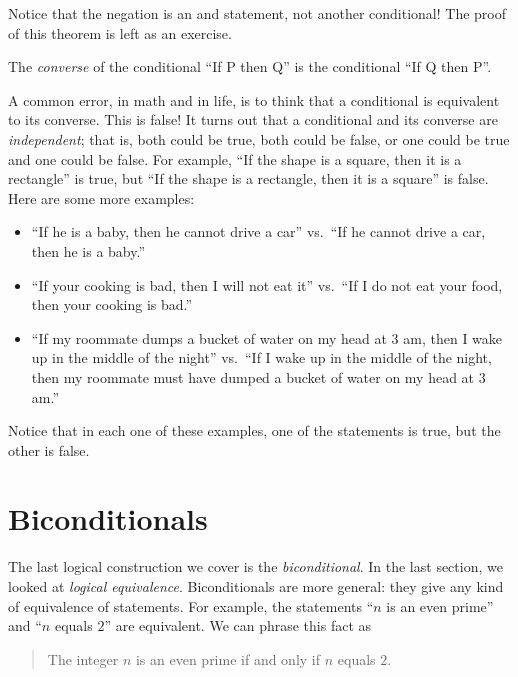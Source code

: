 \documentclass{tufte-book}
\begin{document}
Notice that the negation is an and statement, not another conditional! The proof of this theorem is left as an exercise.

\begin{definition}
  The \emph{converse} of the conditional ``If P then Q'' is the conditional ``If Q then P''.
\end{definition}

A common error, in math and in life, is to think that a conditional is equivalent to its converse. This is false! It turns out that a conditional and its converse are \emph{independent}; that is, both could be true, both could be false, or one could be true and one could be false. For example, ``If the shape is a square, then it is a rectangle'' is true, but ``If the shape is a rectangle, then it is a square'' is false.  Here are some more examples:
\begin{itemize}
    \item ``If he is a baby, then he cannot drive a car'' vs.\ ``If he cannot drive a car, then he is a baby.''
    \item ``If your cooking is bad, then I will not eat it'' vs.\ ``If I do not eat your food, then your cooking is bad.''
    \item ``If my roommate dumps a bucket of water on my head at 3 am, then I wake up in the middle of the night'' vs.\ ``If I wake up in the middle of the night, then my roommate must have dumped a bucket of water on my head at 3 am.''
\end{itemize}

Notice that in each one of these examples, one of the statements is true, but the other is false.



\section{Biconditionals}
\label{sec:biconditionals}

The last logical construction we cover is the \emph{biconditional}. In the last section, we looked at \emph{logical equivalence}. Biconditionals are more general: they give any kind of equivalence of statements. For example, the statements ``$n$ is an even prime'' and ``$n$ equals $2$'' are equivalent. We can phrase this fact as
\begin{quote}
  The integer $n$ is an even prime if and only if $n$ equals $2$.
\end{quote}
\end{document}
